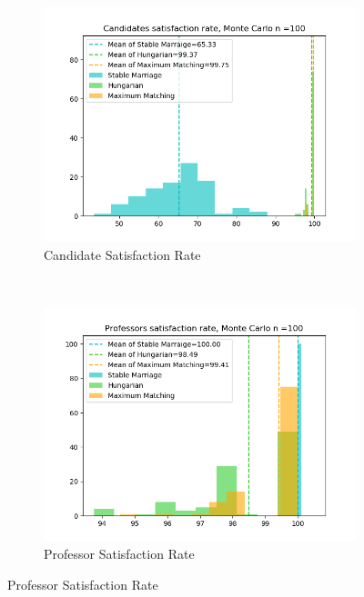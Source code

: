 \documentclass[twoside,twocolumn]{article}
\begin{document}
    \begin{figure}[t]
        \centering
        \begin{subfigure}{0.32\textwidth}
            \centering
            \includegraphics[width=\textwidth]{../figures/200candidates_15courses_100simulations/can_rate.png}
            \caption{Candidate Satisfaction Rate}
        \end{subfigure}%
        ~
        \begin{subfigure}{0.32\textwidth}
            \centering
            \includegraphics[width=\textwidth]{../figures/200candidates_15courses_100simulations/prof_rate.png}
            \caption{Professor Satisfaction Rate}
        \end{subfigure}

\end{figure}
\end{document}

